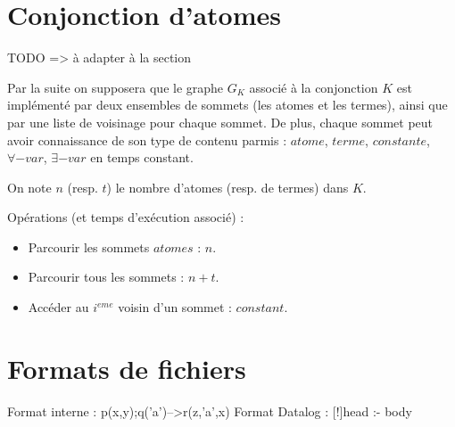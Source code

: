 
\section{Conjonction d'atomes}\label{def_graphe}
TODO => à adapter à la section

Par la suite on supposera que le graphe $G_{K}$ associé à la conjonction $K$ 
est impl\'ement\'e par deux ensembles de sommets (les atomes et les termes), 
ainsi que par une liste de voisinage pour chaque sommet.
De plus, chaque sommet peut avoir connaissance de son type de contenu parmis : 
$atome$, $terme$, $constante$, $\forall-var$, $\exists-var$
en temps constant.

On note $n$ (resp. $t$) le nombre d'atomes (resp. de termes) dans $K$. 

Op\'erations (et temps d'ex\'ecution associ\'e) :
\begin{itemize}
	\item Parcourir les sommets $atomes$ : $n$.
	\item Parcourir tous les sommets : $n + t$.
	\item Acc\'eder au $i^{eme}$ voisin d'un sommet : $constant$.
\end{itemize}


\section{Formats de fichiers}\label{formats_fichiers}
Format interne : p(x,y);q('a')-->r(z,'a',x)
Format Datalog : [!]head :- body

